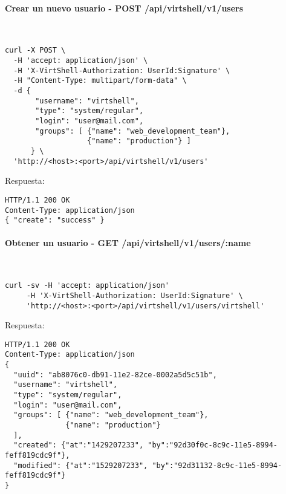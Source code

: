 \paragraph{Crear un nuevo usuario - POST /api/virtshell/v1/users} ~\\

\begin{lstlisting}[style=json]
curl -X POST \
  -H 'accept: application/json' \
  -H 'X-VirtShell-Authorization: UserId:Signature' \
  -H "Content-Type: multipart/form-data" \
  -d {
       "username": "virtshell", 
       "type": "system/regular",
       "login": "user@mail.com",
       "groups": [ {"name": "web_development_team"},
                   {"name": "production"} ]
      } \
  'http://<host>:<port>/api/virtshell/v1/users'
\end{lstlisting}

\vspace{1cm}
Respuesta:
\vspace{1cm}

\begin{lstlisting}[style=json]
HTTP/1.1 200 OK
Content-Type: application/json
{ "create": "success" }
\end{lstlisting}

\paragraph{Obtener un usuario - GET /api/virtshell/v1/users/:name} ~\\

\begin{lstlisting}[style=json]
curl -sv -H 'accept: application/json' 
     -H 'X-VirtShell-Authorization: UserId:Signature' \ 
     'http://<host>:<port>/api/virtshell/v1/users/virtshell'
\end{lstlisting}

\vspace{1cm}
Respuesta:
\vspace{1cm}

\begin{lstlisting}[style=json]
HTTP/1.1 200 OK
Content-Type: application/json
{
  "uuid": "ab8076c0-db91-11e2-82ce-0002a5d5c51b",
  "username": "virtshell",
  "type": "system/regular",
  "login": "user@mail.com",
  "groups": [ {"name": "web_development_team"},
              {"name": "production"}
  ],
  "created": {"at":"1429207233", "by":"92d30f0c-8c9c-11e5-8994-feff819cdc9f"},
  "modified": {"at":"1529207233", "by":"92d31132-8c9c-11e5-8994-feff819cdc9f"}
}
\end{lstlisting}

